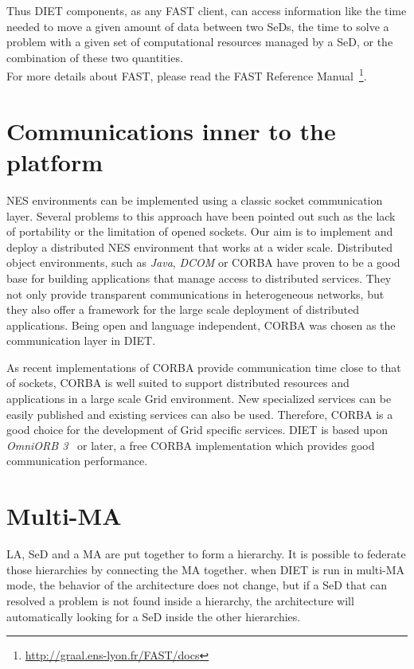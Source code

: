 Thus DIET components, as any FAST client, can access information like the time
needed to move a given amount of data between two SeDs, the time to solve a
problem with a given set of computational resources managed by a SeD, or the
combination of these two quantities.\\

For more details about FAST, please read the FAST Reference Manual~\footnote{\url{http://graal.ens-lyon.fr/FAST/docs}}.


\section{Communications inner to the platform}
\label{sec:CORBA}

NES environments can be implemented using a classic socket
communication layer.  Several problems to this approach have been
pointed out such as the lack of portability or the limitation of
opened sockets. Our aim is to implement and deploy a distributed NES
environment that works at a wider scale. Distributed object
environments, such as \emph{Java}, \emph{DCOM} or CORBA have proven to
be a good base for building applications that manage access to
distributed services. They not only provide transparent communications
in heterogeneous networks, but they also offer a framework for the
large scale deployment of distributed applications. Being open and
language independent, CORBA was chosen as the communication layer in
DIET.

As recent implementations of CORBA provide communication time close to
that of sockets, CORBA is well suited to support distributed resources
and applications in a large scale Grid environment. New specialized
services can be easily published and existing services can also be
used.  Therefore, CORBA is a good choice for the
development of Grid specific services. DIET is based upon
\emph{OmniORB 3}~\cite{OMNIORB} or later, a free CORBA implementation
which provides good communication performance.


\section{Multi-MA}
\label{init:multima}

LA, SeD and a MA are put together to form a hierarchy. It is possible to
federate those hierarchies by connecting the MA together. when DIET is run in
multi-MA mode, the behavior of the architecture does not change, but if a SeD
that can resolved a problem is not found inside a hierarchy, the architecture
will automatically looking for a SeD inside the other hierarchies.

